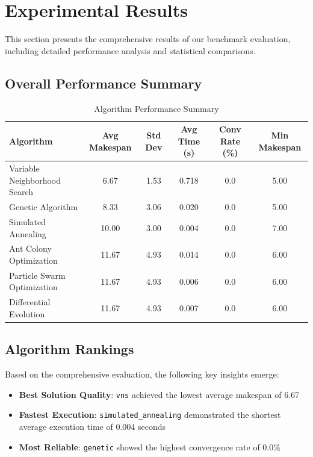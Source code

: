 \documentclass[11pt,a4paper]{article}
\newcommand{\algorithm}[1]{\texttt{#1}}
\begin{document}
\section{Experimental Results}

This section presents the comprehensive results of our benchmark evaluation, including detailed performance analysis and statistical comparisons.

\subsection{Overall Performance Summary}


\begin{table}[H]
\centering
\caption{Algorithm Performance Summary}
\label{tab:performance}
\begin{tabular}{lccccc}
\toprule
Algorithm & Avg Makespan & Std Dev & Avg Time (s) & Conv Rate (\%) & Min Makespan \\
\midrule
Variable Neighborhood Search & 6.67 & 1.53 & 0.718 & 0.0 & 5.00 \\
Genetic Algorithm & 8.33 & 3.06 & 0.020 & 0.0 & 5.00 \\
Simulated Annealing & 10.00 & 3.00 & 0.004 & 0.0 & 7.00 \\
Ant Colony Optimization & 11.67 & 4.93 & 0.014 & 0.0 & 6.00 \\
Particle Swarm Optimization & 11.67 & 4.93 & 0.006 & 0.0 & 6.00 \\
Differential Evolution & 11.67 & 4.93 & 0.007 & 0.0 & 6.00 \\

\bottomrule
\end{tabular}
\end{table}




\subsection{Algorithm Rankings}

Based on the comprehensive evaluation, the following key insights emerge:

\begin{itemize}
    \item \textbf{Best Solution Quality}: \algorithm{vns} achieved the lowest average makespan of 6.67
    \item \textbf{Fastest Execution}: \algorithm{simulated_annealing} demonstrated the shortest average execution time of 0.004 seconds
    \item \textbf{Most Reliable}: \algorithm{genetic} showed the highest convergence rate of 0.0\%
\end{itemize}
\end{document}
